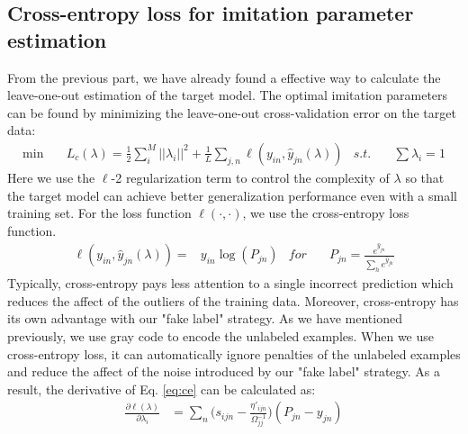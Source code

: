 \subsection{Cross-entropy loss for imitation parameter estimation}
From the previous part, we have already found a effective way to calculate the leave-one-out estimation of the target model. The optimal imitation parameters can be found by minimizing the leave-one-out cross-validation error on the target data:
\begin{equation}\label{eq:loo_loss}
\begin{aligned}
\min \quad& L_c\left(\lambda\right)=\frac{1}{2}\sum_i^M||\lambda_i||^2+\frac{1}{L}\sum_{j,n}\ell\left(y_{in},\hat{y}_{jn}\left(\lambda\right)\right) &
s.t. \quad& \sum\lambda_i=1
\end{aligned}
\end{equation}
Here we use the $\ell$-2 regularization term to control the complexity of $\lambda$ so that the target model can achieve better generalization performance even with a small training set. For the loss function $\ell(\cdot,\cdot)$, we use the cross-entropy loss function.
\begin{equation}\label{eq:ce}
\begin{aligned}
\ell\left(y_{in},\hat{y}_{jn}\left(\lambda\right)\right)=&y_{in}\log(P_{jn}) & for \quad&
P_{jn} = \frac{e^{\hat{y}_{jn}}}{\sum_{h} e^{\hat{y}_{jh}}}
\end{aligned}
\end{equation}
Typically, cross-entropy pays less attention to a single incorrect prediction which reduces the affect of the outliers of the training data. Moreover, cross-entropy has its own advantage with our "fake label" strategy. As we have mentioned previously, we use gray code to encode the unlabeled examples. When we use cross-entropy loss, it can automatically ignore penalties of the unlabeled examples and reduce the affect of the noise introduced by our "fake label" strategy. 
As a result, the derivative of Eq. \eqref{eq:ce} can be calculated as:
\begin{equation}\label{eq:p}
\begin{aligned}
\frac{\partial \ell(\lambda)}{\partial \lambda_i}&=\sum_n\bigg(s_{ijn}-\frac{{\eta}'_{ijn}}{\Omega_{jj}^{-1}}\bigg)\left(P_{jn}-{y}_{jn}\right)
\end{aligned}
\end{equation}
